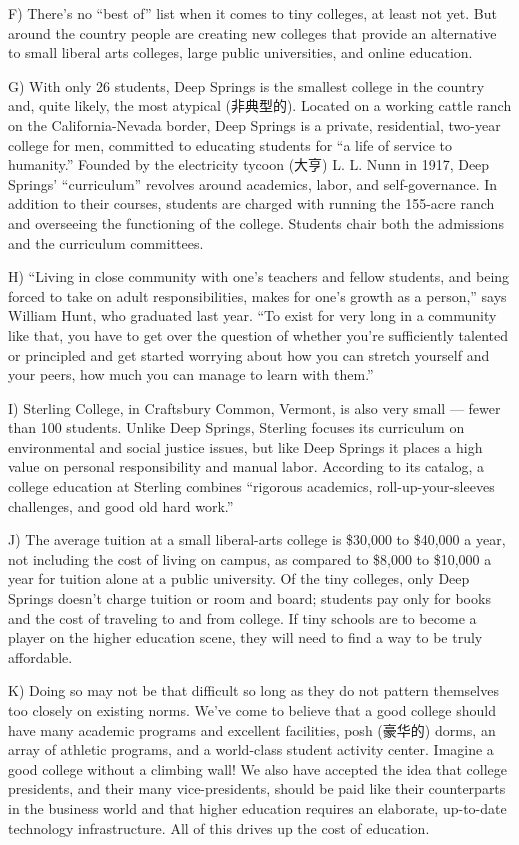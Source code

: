 \documentclass[UTF8,11pt]{ctexart}
\begin{document}
F) There’s no “best of” list when it comes to tiny colleges, at least not yet. But around the country people are creating new colleges that provide an alternative to small liberal arts colleges, large public universities, and online education.


G) With only 26 students, Deep Springs is the smallest college in the country and, quite likely, the most atypical (非典型的). Located on a working cattle ranch on the California-Nevada border, Deep Springs is a private, residential, two-year college for men, committed to educating students for “a life of service to humanity.” Founded by the electricity tycoon (大亨) L. L. Nunn in 1917, Deep Springs’ “curriculum” revolves around academics, labor, and self-governance. In addition to their courses, students are charged with running the 155-acre ranch and overseeing the functioning of the college. Students chair both the admissions and the curriculum committees.


H) “Living in close community with one’s teachers and fellow students, and being forced to take on adult responsibilities, makes for one’s growth as a person,” says William Hunt, who graduated last year. “To exist for very long in a community like that, you have to get over the question of whether you’re sufficiently talented or principled and get started worrying about how you can stretch yourself and your peers, how much you can manage to learn with them.”


I) Sterling College, in Craftsbury Common, Vermont, is also very small — fewer than 100 students. Unlike Deep Springs, Sterling focuses its curriculum on environmental and social justice issues, but like Deep Springs it places a high value on personal responsibility and manual labor. According to its catalog, a college education at Sterling combines “rigorous academics, roll-up-your-sleeves challenges, and good old hard work.”


J) The average tuition at a small liberal-arts college is \$30,000 to \$40,000 a year, not including the cost of living on campus, as compared to \$8,000 to \$10,000 a year for tuition alone at a public university. Of the tiny colleges, only Deep Springs doesn’t charge tuition or room and board; students pay only for books and the cost of traveling to and from college. If tiny schools are to become a player on the higher education scene, they will need to find a way to be truly affordable.


K) Doing so may not be that difficult so long as they do not pattern themselves too closely on existing norms. We’ve come to believe that a good college should have many academic programs and excellent facilities, posh (豪华的) dorms, an array of athletic programs, and a world-class student activity center. Imagine a good college without a climbing wall! We also have accepted the idea that college presidents, and their many vice-presidents, should be paid like their counterparts in the business world and that higher education requires an elaborate, up-to-date technology infrastructure. All of this drives up the cost of education.
\end{document}

